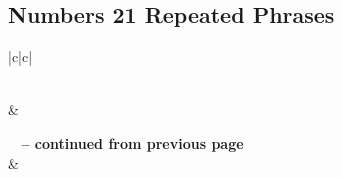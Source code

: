 \subsection{Numbers 21 Repeated Phrases}


\normalsize
 
\begin{center}
\begin{longtable}{|c|c|}
\caption[Numbers 21 Repeated Phrases]{Numbers 21 Repeated Phrases}\label{table:Repeated Phrases Numbers 21} \\
\hline {} &  \\ \hline 
\endfirsthead
 
{{\bfseries \tablename\ \thetable{} -- continued from previous page}} \\  
\hline {} &  \\ \hline 
\endhead
 

\end{longtable}
\end{center}
